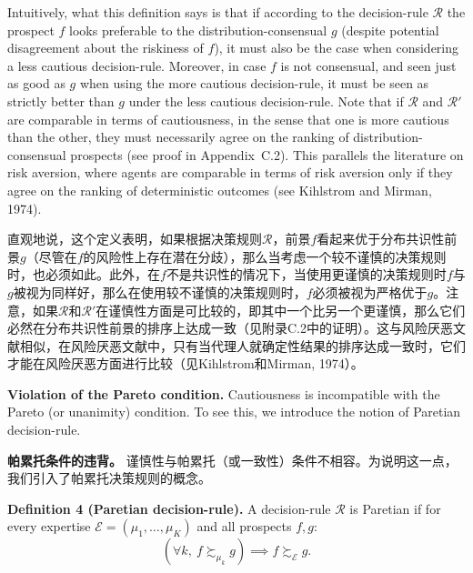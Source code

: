\documentclass[12pt,a4paper]{article}
\newenvironment{original}
  {\par\noindent\ignorespaces}
  {\par}
\newenvironment{translation}
  {\par\noindent{\color{transblue}\ignorespaces}}
  {\par\medskip}
\begin{document}
\begin{original}
Intuitively, what this definition says is that if according to the decision-rule $\mathcal{R}$ the prospect $f$ looks preferable to the distribution-consensual $g$ (despite potential disagreement about the riskiness of $f$), it must also be the case when considering a less cautious decision-rule. Moreover, in case $f$ is not consensual, and seen just as good as $g$ when using the more cautious decision-rule, it must be seen as strictly better than $g$ under the less cautious decision-rule. Note that if $\mathcal{R}$ and $\mathcal{R}'$ are comparable in terms of cautiousness, in the sense that one is more cautious than the other, they must necessarily agree on the ranking of distribution-consensual prospects (see proof in Appendix~C.2). This parallels the literature on risk aversion, where agents are comparable in terms of risk aversion only if they agree on the ranking of deterministic outcomes (see Kihlstrom and Mirman, 1974).
\end{original}

\begin{translation}
直观地说，这个定义表明，如果根据决策规则$\mathcal{R}$，前景$f$看起来优于分布共识性前景$g$（尽管在$f$的风险性上存在潜在分歧），那么当考虑一个较不谨慎的决策规则时，也必须如此。此外，在$f$不是共识性的情况下，当使用更谨慎的决策规则时$f$与$g$被视为同样好，那么在使用较不谨慎的决策规则时，$f$必须被视为严格优于$g$。注意，如果$\mathcal{R}$和$\mathcal{R}'$在谨慎性方面是可比较的，即其中一个比另一个更谨慎，那么它们必然在分布共识性前景的排序上达成一致（见附录C.2中的证明）。这与风险厌恶文献相似，在风险厌恶文献中，只有当代理人就确定性结果的排序达成一致时，它们才能在风险厌恶方面进行比较（见Kihlstrom和Mirman, 1974）。
\end{translation}

\begin{original}
\textbf{Violation of the Pareto condition.} Cautiousness is incompatible with the Pareto (or unanimity) condition. To see this, we introduce the notion of Paretian decision-rule.
\end{original}

\begin{translation}
\textbf{帕累托条件的违背。} 谨慎性与帕累托（或一致性）条件不相容。为说明这一点，我们引入了帕累托决策规则的概念。
\end{translation}

\begin{original}
\textbf{Definition 4 (Paretian decision-rule).} A decision-rule $\mathcal{R}$ is Paretian if for every expertise $\mathcal{E} = (\mu_{1}, \dots, \mu_{K})$ and all prospects $f, g$:
\[
(\forall k,\ f \succsim_{\mu_{k}} g) \implies f \succsim_{\mathcal{E}} g.
\]
\end{original}
\end{document}
